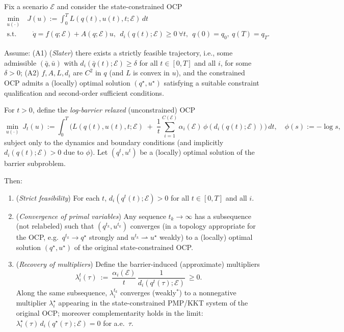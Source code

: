 \begin{proposition}
\label{prop:barrier_convergence}
Fix a scenario $\mathcal E$ and consider the state-constrained OCP
\begin{equation}
\begin{aligned}
\min_{u(\cdot)}&\ J(u):=\int_0^T L(q(t),u(t),t;\mathcal E)\,dt
\\ \text{s.t.}&\quad
\dot q=f(q;\mathcal E)+A(q;\mathcal E)u,\ \ d_i(q(t);\mathcal E)\ge 0\ \forall t,\ \ q(0)=q_0,\ q(T)=q_T.    
\end{aligned}
\end{equation}

Assume:
(A1) (\emph{Slater}) there exists a strictly feasible trajectory, i.e., some admissible $(\bar q,\bar u)$ with
$d_i(\bar q(t);\mathcal E)\ge \delta$ for all $t\in[0,T]$ and all $i$, for some $\delta>0$;
(A2) $f,A,L,d_i$ are $C^2$ in $q$ (and $L$ is convex in $u$), and the constrained OCP admits a (locally) optimal solution
$(q^\star,u^\star)$ satisfying a suitable constraint qualification and second-order sufficient conditions.

For $t>0$, define the \emph{log-barrier relaxed} (unconstrained) OCP
\[
\min_{u(\cdot)}\ J_t(u):=\int_0^T \Big(
L(q(t),u(t),t;\mathcal E)\;+\;\frac{1}{t}\sum_{i=1}^{C(\mathcal E)} \alpha_i(\mathcal E)\, \phi(d_i(q(t);\mathcal E))
\Big)\,dt,
\quad
\phi(s):=-\log s,
\]
subject only to the dynamics and boundary conditions (and implicitly $d_i(q(t);\mathcal E)>0$ due to $\phi$).
Let $(q^t,u^t)$ be a (locally) optimal solution of the barrier subproblem.

Then:
\begin{enumerate}
\item (\emph{Strict feasibility}) For each $t$, $d_i(q^t(t);\mathcal E)>0$ for all $t\in[0,T]$ and all $i$.
\item (\emph{Convergence of primal variables}) Any sequence $t_k\to\infty$ has a subsequence (not relabeled) such that
$(q^{t_k},u^{t_k})$ converges (in a topology appropriate for the OCP, e.g.\ $q^{t_k}\to q^\star$ strongly and $u^{t_k}\rightharpoonup u^\star$ weakly)
to a (locally) optimal solution $(q^\star,u^\star)$ of the original state-constrained OCP.
\item (\emph{Recovery of multipliers}) Define the barrier-induced (approximate) multipliers
\[
\lambda_i^t(\tau)\ :=\ \frac{\alpha_i(\mathcal E)}{t}\,\frac{1}{d_i(q^t(\tau);\mathcal E)}\ \ge 0.
\]
Along the same subsequence, $\lambda_i^{t_k}$ converges (weakly$^\ast$) to a nonnegative multiplier $\lambda_i^\star$
appearing in the state-constrained PMP/KKT system of the original OCP; moreover complementarity holds in the limit:
$\lambda_i^\star(\tau)\,d_i(q^\star(\tau);\mathcal E)=0$ for a.e.\ $\tau$.
\end{enumerate}
\end{proposition}

